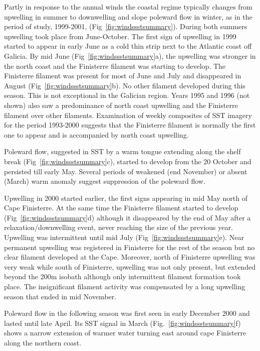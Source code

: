 Partly in response to the annual winds the coastal regime
typically changes from upwelling in summer to downwelling and
slope poleward flow in winter, as in the period of study,
1999-2001, ({Fig~\ref{fig:windssstsummary}}). During both summers
upwelling took place from June-October. The first sign of
upwelling in 1999 started to appear in early June as a cold thin
strip next to the Atlantic coast off Galicia. By mid June
(Fig~\ref{fig:windssstsummary}a), the upwelling was stronger in
the north coast and the Finisterre filament was starting to
develop. The Finisterre filament was present for most of June and
July and disappeared in August (Fig~\ref{fig:windssstsummary}b).
No other filament developed during this season. This is not
exceptional in the Galician region. Years 1995 and 1996 (not
shown) also saw a predominance of north coast upwelling and the
Finisterre filament over other filaments. Examination of weekly
composites of SST imagery for the period 1993-2000 suggests that
the Finisterre filament is normally the first one to appear and is
accompanied by north coast upwelling.

Poleward flow, suggested in SST by a warm tongue extending along
the shelf break (Fig~\ref{fig:windssstsummary}c), started to
develop from the 20 October and persisted till early May.  Several
periods of weakened (end November) or absent (March) warm anomaly
suggest suppression of the poleward flow.

Upwelling in 2000 started earlier, the first signs appearing in
mid May north of Cape Finisterre. At the same time the Finisterre
filament started to develop (Fig~\ref{fig:windssstsummary}d)
although it disappeared by the end of May after a
relaxation/downwelling event, never reaching the size of the
previous year. Upwelling was intermittent until mid July
(Fig~\ref{fig:windssstsummary}e). Near permanent upwelling was
registered in Finisterre for the rest of the season but no clear
filament developed at the Cape. Moreover, north of Finisterre
upwelling was very weak while south of Finisterre, upwelling was
not only present, but extended beyond the 200m isobath although
only intermittent filament formation took place. The insignificant
filament activity was compensated by a long upwelling season that
ended in mid November.

Poleward flow in the following season was first seen in early
December 2000 and lasted until late April. Its SST signal in March
(Fig.~\ref{fig:windssstsummary}f) shows a narrow extension of
warmer water turning east around cape Finisterre along the
northern coast.

